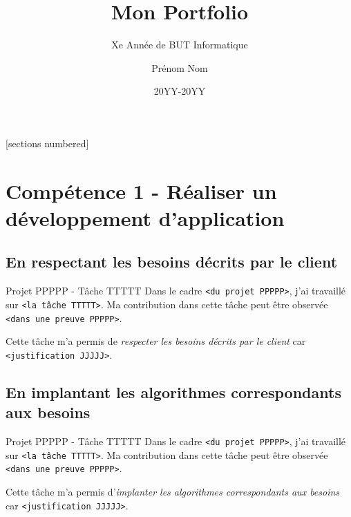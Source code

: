 \documentclass[%
    10pt,%
    usenames,%
    dvipsnames%
]{beamer}
\title{Mon Portfolio}
\subtitle{Xe Année de BUT Informatique}
\date{20YY-20YY}
\author{{Prénom Nom}}
\institute{}
\begin{document}
\maketitle

\begin{frame}{\contentsname}
    [sections numbered]
    \tableofcontents[hideallsubsections]
\end{frame}

\section{Compétence 1 - Réaliser un développement
d'application}\label{compuxe9tence-1---ruxe9aliser-un-duxe9veloppement-dapplication}

\subsection{En respectant les besoins décrits par le
client}\label{en-respectant-les-besoins-duxe9crits-par-le-client}

\begin{frame}[fragile]{Projet PPPPP - Tâche TTTTT}
\label{projet-ppppp---tuxe2che-ttttt}
Dans le cadre \texttt{\textless{}du\ projet\ PPPPP\textgreater{}}, j'ai
travaillé sur \texttt{\textless{}la\ tâche\ TTTTT\textgreater{}}. Ma
contribution dans cette tâche peut être observée
\texttt{\textless{}dans\ une\ preuve\ PPPPP\textgreater{}}.

Cette tâche m'a permis de \emph{respecter les besoins décrits par le
client} car \texttt{\textless{}justification\ JJJJJ\textgreater{}}.
\end{frame}

\subsection{En implantant les algorithmes correspondants aux
besoins}\label{en-implantant-les-algorithmes-correspondants-aux-besoins}

\begin{frame}[fragile]{Projet PPPPP - Tâche TTTTT}
\label{projet-ppppp---tuxe2che-ttttt-1}
Dans le cadre \texttt{\textless{}du\ projet\ PPPPP\textgreater{}}, j'ai
travaillé sur \texttt{\textless{}la\ tâche\ TTTTT\textgreater{}}. Ma
contribution dans cette tâche peut être observée
\texttt{\textless{}dans\ une\ preuve\ PPPPP\textgreater{}}.

Cette tâche m'a permis d'\emph{implanter les algorithmes correspondants
aux besoins} car \texttt{\textless{}justification\ JJJJJ\textgreater{}}.
\end{frame}
\end{document}

